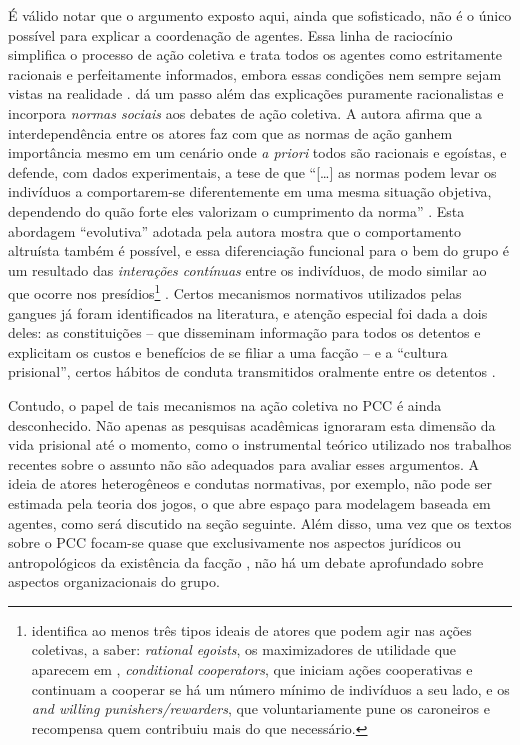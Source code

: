 \documentclass[a4paper,11pt]{article}
\begin{document}
É válido notar que o argumento exposto aqui, ainda que sofisticado, não é o único possível para explicar a coordenação de agentes. Essa linha de raciocínio simplifica o processo de ação coletiva e trata todos os agentes como estritamente racionais e perfeitamente informados, embora essas condições nem sempre sejam vistas na realidade \citep{baldassarri2009collective}. \citet{ostrom2000collective} dá um passo além das explicações puramente racionalistas e incorpora \textit{normas sociais} aos debates de ação coletiva. A autora afirma que a interdependência entre os atores faz com que as normas de ação ganhem importância mesmo em um cenário onde \textit{a priori} todos são racionais e egoístas, e defende, com dados experimentais, a tese de que ``[\dots] as normas podem levar os indivíduos a comportarem-se diferentemente em uma mesma situação objetiva, dependendo do quão forte eles valorizam o cumprimento da norma'' \citep[144]{ostrom2000collective}. Esta abordagem ``evolutiva'' adotada pela autora mostra que o comportamento altruísta também é possível, e essa diferenciação funcional para o bem do grupo é um resultado das \textit{interações contínuas} entre os indivíduos, de modo similar ao que ocorre nos presídios\footnote{\citet{ostrom2000collective} identifica ao menos três tipos ideais de atores que podem agir nas ações coletivas, a saber: \textit{rational egoists}, os maximizadores de utilidade que aparecem em \citet{olson1965logic}, \textit{conditional cooperators}, que iniciam ações cooperativas e continuam a cooperar se há um número mínimo de indivíduos a seu lado, e os \textit{and willing punishers/rewarders}, que voluntariamente pune os caroneiros e recompensa quem contribuiu mais do que necessário.} \citep[144]{ostrom2000collective}. Certos mecanismos normativos utilizados pelas gangues já foram identificados na literatura, e atenção especial foi dada a dois deles: as constituições -- que disseminam informação para todos os detentos e explicitam os custos e benefícios de se filiar a uma facção \citep{leeson2010criminal} -- e a ``cultura prisional'', certos hábitos de conduta transmitidos oralmente entre os detentos \citep{irwin1962thieves}. 

Contudo, o papel de tais mecanismos na ação coletiva no PCC é ainda desconhecido. Não apenas as pesquisas acadêmicas ignoraram esta dimensão da vida prisional até o momento, como o instrumental teórico utilizado nos trabalhos recentes sobre o assunto não são adequados para avaliar esses argumentos. A ideia de atores heterogêneos e condutas normativas, por exemplo, não pode ser estimada pela teoria dos jogos, o que abre espaço para modelagem baseada em agentes, como será discutido na seção seguinte. Além disso, uma vez que os textos sobre o PCC focam-se quase que exclusivamente nos aspectos jurídicos ou antropológicos da existência da facção \citep[365]{dias2011pulverizaccao}, não há um debate aprofundado sobre aspectos organizacionais do grupo.
\end{document}
